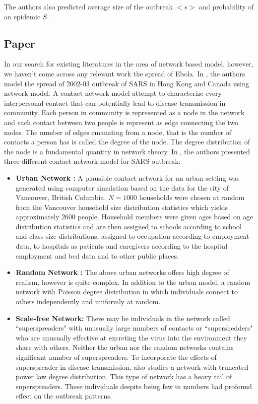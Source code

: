 \documentclass[12pt, journal,onecolumn]{IEEEtran}
\begin{document}
The authors also predicted average size of the outbreak $<s>$ and probability of an epidemic $S$. 



\subsection{Paper \cite{meyers2005network}}
In our search for existing literatures in the area of network based model, however, we haven't come across any relevant work the spread of Ebola. In \cite{meyers2005network}, the authors model the spread of 2002-03 outbreak of SARS in Hong Kong and Canada using network model. A contact network model attempt to characterize every interpersonal contact that can potentially lead to disease transmission in community. Each person in community is represented as a node in the network and each contact between two people is represent as edge connecting the two nodes. The number of edges emanating from a node, that is the number of contacts a person has is called the degree of the node. The degree distribution of the node is a fundamental quantity in network theory.   In \cite{meyers2005network}, the authors presented three different contact network model for SARS outbreak:

\begin{itemize}
\item \textbf{Urban Network : }  A plausible contact network for an urban setting was generated using computer simulation based on the data for the city of Vancouver, British Columbia. $N=1000$ households were chosen at random from the Vancouver household size distribution statistics which yields approximately 2600 people. Household members were given ages based on age distribution statistics and are then assigned to schools according to school and class size distributions, assigned to occupation according to employment data, to hospitals as patients and caregivers according to the hospital employment and bed data and to other public places. 
\item \textbf{Random Network : } The above urban networks offers high degree of realism, however is quite complex. In addition to the urban model, a random network with Poisson degree distribution in which individuals connect to others independently and uniformly at random. 
\item \textbf{Scale-free Network: } There may be individuals in the network called ``superspreaders" with unusually large numbers of contacts or ``supershedders" who are unusually effective at excreting the virus into the environment they share with others. Neither the urban nor the random networks contains significant number of superspreaders. To incorporate the effects of superspreader in disease transmission, \cite{meyers2005network} also studies a network with truncated power law degree distribution. This type of network has a heavy tail of superspreaders. These individuals despite being few in numbers had profound effect on the outbreak patterns. 
\end{itemize}
 
\end{document}
